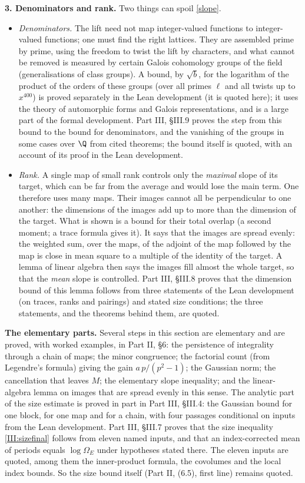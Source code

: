 \documentclass[11pt,letterpaper]{article}
\begin{document}
\textbf{3. Denominators and rank.} Two things can spoil \eqref{slope}.
\begin{itemize}
\item \emph{Denominators.} The lift need not map integer-valued functions to integer-valued functions; one
must find the right lattices. They are assembled prime by prime, using the freedom to twist the lift by
characters, and what cannot be removed is measured by certain Galois cohomology groups of the field
(generalisations of class groups). A bound, by $\sqrt b$, for the logarithm of the product of the orders of these groups
(over all primes $\ell$ and all twists up to $x^{400}$) is proved
separately in the Lean development (it is quoted here); it uses the theory of automorphic forms and Galois representations, and is a large part of the
formal development. Part III, \S III.9 proves the step from this bound to the bound for denominators, and
the vanishing of the groups in some cases over $\Q$ from cited theorems; the bound itself is quoted, with
an account of its proof in the Lean development.
\item \emph{Rank.} A single map of small rank controls only the \emph{maximal} slope of its target, which
can be far from the average and would lose the main term. One therefore uses many maps. Their images cannot
all be perpendicular to one another: the dimensions of the images add up to more than the dimension of the
target. What is
shown is a bound for their total overlap (a second moment; a trace formula gives it). It says that the images
are spread evenly: the weighted sum, over the maps, of the adjoint of the map followed by the map is close
in mean square to a multiple of the identity of the target. A lemma of linear
algebra then says the images fill almost the whole target, so that the \emph{mean} slope is controlled.
Part III, \S III.8 proves that the dimension bound of this lemma follows from three statements of the Lean
development (on traces, ranks and pairings) and stated size conditions; the three statements, and the
theorems behind them, are quoted.
\end{itemize}

\textbf{The elementary parts.} Several steps in this section are elementary and are proved, with worked
examples, in Part II, \S6: the persistence of integrality through a chain of maps;
the minor congruence; the factorial count (from Legendre's formula) giving the gain
$a\,p/(p^2-1)$; the Gaussian norm; the cancellation that leaves $M$; the elementary slope
inequality; and the linear-algebra lemma on images that are spread evenly in this sense.
The analytic part of the size estimate is proved in part in Part III, \S III.4: the Gaussian bound for one
block, for one map and for a chain, with four passages conditional on inputs from the Lean development.
Part III, \S III.7 proves that the size inequality \eqref{III:sizefinal} follows from eleven named inputs,
and that an index-corrected mean of periods equals $\log\Omega_E$ under hypotheses stated there. The eleven
inputs are quoted, among them the inner-product formula, the covolumes and the local index bounds. So the
size bound itself (Part II, (6.5), first line) remains quoted.
\end{document}
